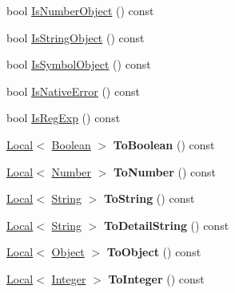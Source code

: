 \begin{DoxyCompactItemize}
bool \hyperlink{classv8_1_1_value_a5f4aa9504a6d8fc3af9489330179fe14}{Is\+Number\+Object} () const 
\item 
bool \hyperlink{classv8_1_1_value_a3e0f2727455fd01a39a60b92f77e28e0}{Is\+String\+Object} () const 
\item 
bool \hyperlink{classv8_1_1_value_a867baa94cb8f1069452359e6cef6751e}{Is\+Symbol\+Object} () const 
\item 
bool \hyperlink{classv8_1_1_value_a579fb52e893cdc24f8b77e5acc77d06d}{Is\+Native\+Error} () const 
\item 
bool \hyperlink{classv8_1_1_value_aae41e43486937d6122c297a0d43ac0b8}{Is\+Reg\+Exp} () const 
\item 
\hypertarget{classv8_1_1_value_a73d653dc4a4999ce7258b40a4d8a1510}{}\hyperlink{classv8_1_1_local}{Local}$<$ \hyperlink{classv8_1_1_boolean}{Boolean} $>$ {\bfseries To\+Boolean} () const \label{classv8_1_1_value_a73d653dc4a4999ce7258b40a4d8a1510}

\item 
\hypertarget{classv8_1_1_value_a2706d2c0cf684a5179e76e8e404b3a5d}{}\hyperlink{classv8_1_1_local}{Local}$<$ \hyperlink{classv8_1_1_number}{Number} $>$ {\bfseries To\+Number} () const \label{classv8_1_1_value_a2706d2c0cf684a5179e76e8e404b3a5d}

\item 
\hypertarget{classv8_1_1_value_aef5739280886eb7a98ae0e98371dae39}{}\hyperlink{classv8_1_1_local}{Local}$<$ \hyperlink{classv8_1_1_string}{String} $>$ {\bfseries To\+String} () const \label{classv8_1_1_value_aef5739280886eb7a98ae0e98371dae39}

\item 
\hypertarget{classv8_1_1_value_acff61b07d724079dc3a90d3e3fd57cb3}{}\hyperlink{classv8_1_1_local}{Local}$<$ \hyperlink{classv8_1_1_string}{String} $>$ {\bfseries To\+Detail\+String} () const \label{classv8_1_1_value_acff61b07d724079dc3a90d3e3fd57cb3}

\item 
\hypertarget{classv8_1_1_value_af40feaf010e829f2cdb787eb975b941d}{}\hyperlink{classv8_1_1_local}{Local}$<$ \hyperlink{classv8_1_1_object}{Object} $>$ {\bfseries To\+Object} () const \label{classv8_1_1_value_af40feaf010e829f2cdb787eb975b941d}

\item 
\hypertarget{classv8_1_1_value_a3941f80b54b0707c6153657cc688ac93}{}\hyperlink{classv8_1_1_local}{Local}$<$ \hyperlink{classv8_1_1_integer}{Integer} $>$ {\bfseries To\+Integer} () const \label{classv8_1_1_value_a3941f80b54b0707c6153657cc688ac93}


\end{DoxyCompactItemize}
